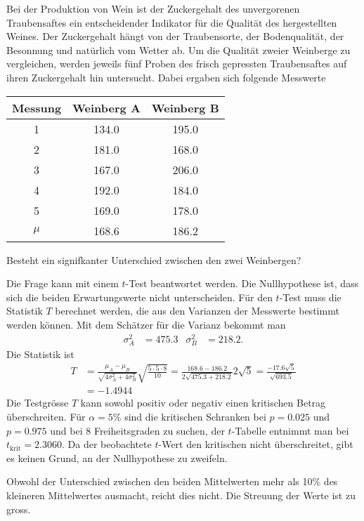 Bei der Produktion von Wein ist der Zuckergehalt des unvergorenen
Traubensaftes ein entscheidender Indikator für die Qualität des
hergestellten Weines. Der Zuckergehalt hängt von der Traubensorte,
der Bodenqualität, der Besonnung und natürlich vom Wetter ab.
Um die Qualität zweier Weinberge zu vergleichen, werden jeweils
fünf Proben
des frisch gepressten Traubensaftes auf ihren Zuckergehalt hin
untersucht. Dabei ergaben sich folgende Messwerte

\begin{center}
\begin{tabular}{|c|cc|}
\hline
Messung&Weinberg A&Weinberg B\\
\hline
1&134.0&195.0\\
2&181.0&168.0\\
3&167.0&206.0\\
4&192.0&184.0\\
5&169.0&178.0\\
\hline
$\mu$ &168.6&186.2\\
\hline
\end{tabular}
\end{center}
Besteht ein signifkanter Unterschied zwischen den zwei Weinbergen?


\begin{loesung}
Die Frage kann mit einem $t$-Test beantwortet werden.
Die Nullhypothese ist, dass sich die beiden Erwartungswerte
nicht unterscheiden. Für den $t$-Test muss die Statistik $T$
berechnet werden, die aus den Varianzen der Messwerte 
bestimmt werden können. Mit dem Schätzer für die Varianz
bekommt man
\begin{align*}
\sigma_A^2&=475.3&
\sigma_B^2&=218.2.
\end{align*}
Die Statistik ist
\begin{align*}
T&=\frac{\mu_A-\mu_B}{\sqrt{4\sigma_A^2+4\sigma_B^2}}\sqrt{\frac{5\cdot5\cdot 8}{10}}
=\frac{168.6-186.2}{2\sqrt{475.3+218.2}}2\sqrt{5}
=\frac{-17.6\sqrt{5}}{\sqrt{693.5}}
\\
&=-1.4944
\end{align*}
Die Testgrösse $T$ kann sowohl positiv oder negativ einen kritischen
Betrag überschreiten.
Für $\alpha=5\%$ sind die kritischen Schranken bei $p=0.025$ und $p=0.975$
und bei $8$ Freiheitsgraden zu suchen, der $t$-Tabelle entnimmt man
bei $t_{\text{krit}}=2.3060$. Da der beobachtete $t$-Wert den kritischen
nicht überschreitet, gibt es keinen Grund, an der Nullhypothese
zu zweifeln.

Obwohl der Unterschied zwischen den beiden Mittelwerten mehr als 10\%
des kleineren Mittelwertes ausmacht, reicht dies nicht. Die Streuung
der Werte ist zu gross.
\end{loesung}
